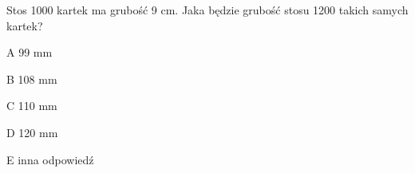 \begin{tresc}
Stos 1000 kartek ma grubość 9 cm. Jaka będzie grubość stosu 1200 takich samych kartek?
\end{tresc}
\begin{wariant}{A} 99 mm \end{wariant}
\begin{wariant}{B} 108 mm \end{wariant}
\begin{wariant}{C} 110 mm \end{wariant}
\begin{wariant}{D} 120 mm \end{wariant}
\begin{wariant}{E} inna odpowiedź \end{wariant}
